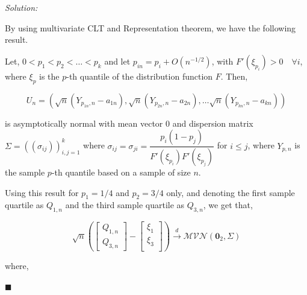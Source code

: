 \documentclass[12pt]{article}
\theoremstyle{definition}
\newenvironment{answer}{\textit{Solution: }\quad }{ \hfill $\blacksquare$}
\numberwithin{equation}{section}
\begin{document}
\begin{answer}
\begin{enumerate}
        By using multivariate CLT and Representation theorem, we have the following result.

        Let, $0 < p_1 < p_2 < \dots < p_k$ and let $p_{in} = p_i + O\left( n^{-1/2} \right)$, with $F'(\xi_{p_i}) > 0 \quad \forall i$, where $\xi_{p}$ is the $p$-th quantile of the distribution function $F$. Then, 

        $$U_n = \left( \sqrt{n}(Y_{p_{1n}, n} - a_{1n}), \sqrt{n}(Y_{p_{2n}, n} - a_{2n}), \dots \sqrt{n}(Y_{p_{kn}, n} - a_{kn})  \right)$$

        is asymptotically normal with mean vector $0$ and dispersion matrix $\Sigma = ((\sigma_{ij}))_{i, j = 1}^{k}$ where $\sigma_{ij} = \sigma_{ji} = \dfrac{p_i(1 - p_j)}{F'(\xi_{p_i}) F'(\xi_{p_j})}$ for $i \leq j$, where $Y_{p, n}$ is the sample $p$-th quantile based on a sample of size $n$.

        Using this result for $p_1 = 1/4$ and $p_2 = 3/4$ only, and denoting the first sample quartile as $Q_{1, n}$ and the third sample quartile as $Q_{3, n}$, we get that,  

        \begin{equation}
            \sqrt{n}\left(
            \begin{bmatrix}
                Q_{1, n}\\
                Q_{3, n} 
            \end{bmatrix}
            - \begin{bmatrix}
                \xi_1\\
                \xi_3\\
            \end{bmatrix}
            \right) \xrightarrow{d}
            \mathcal{MVN} \left( \bm{0}_2, \Sigma \right)
        \label{eqn:7-3}
        \end{equation}

        where,


\end{enumerate}
\end{answer}
\end{document}
